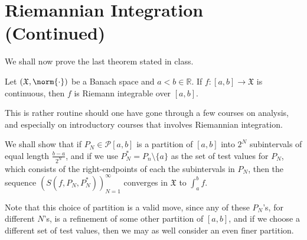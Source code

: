 \documentclass[notoc,notitlepage]{tufte-book}
\begin{document}
\section{Riemannian Integration (Continued)}%
\label{sec:riemannian_integration_continued}

We shall now prove the last theorem stated in class.

\begin{thm}\label{thm:continuous_functions_are_riemann_integrable}
  Let $(\mathfrak{X}, \norm{\cdot})$ be a Banach space and $a < b \in
  \mathbb{R}$. If $f : [a, b] \to \mathfrak{X}$ is continuous, then $f$ is
  Riemann integrable over $[a, b]$.
\end{thm}

\begin{strategy}
  This is rather routine should one have gone through a few courses on analysis,
  and especially on introductory courses that involves Riemannian integration.

  We shall show that if $P_N \in \mathcal{P}[a, b]$ is a partition of $[a, b]$ 
  into $2^N$ subintervals of equal length $\frac{b - a}{2^N}$, and if we use
  $P_N^* = P_n \setminus \{ a \}$ as the set of test values for $P_N$, which
  consists of the right-endpoints of each the subintervals in $P_N$, then the
  sequence $(S(f, P_N, P_N^*))_{N = 1}^{\infty}$ converges in $\mathfrak{X}$ to
  $\int_{a}^{b} f$.

  Note that this choice of partition is a valid move, since any of these
  $P_N$'s, for different $N$'s, is a refinement of some other partition of $[a,
  b]$, and if we choose a different set of test values, then we may as well
  consider an even finer partition.
\end{strategy}
\end{document}
